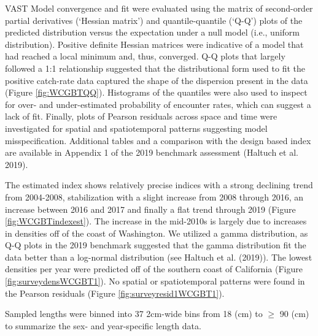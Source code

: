 \documentclass[11pt,
  english,
  a4paper,
]{article}
\begin{document}
VAST Model convergence and fit were evaluated using the matrix of second-order partial derivatives (`Hessian matrix') and quantile-quantile (`Q-Q') plots of the predicted distribution versus the expectation under a null model (i.e., uniform distribution). Positive definite Hessian matrices were indicative of a model that had reached a local minimum and, thus, converged. Q-Q plots that largely followed a 1:1 relationship suggested that the distributional form used to fit the positive catch-rate data captured the shape of the dispersion present in the data (Figure \ref{fig:WCGBTQQ}). Histograms of the quantiles were also used to inspect for over- and under-estimated probability of encounter rates, which can suggest a lack of fit. Finally, plots of Pearson residuals across space and time were investigated for spatial and spatiotemporal patterns suggesting model misspecification. Additional tables and a comparison with the design based index are available in Appendix 1 of the 2019 benchmark assessment {(Haltuch et al. 2019)\leavevmode\tagmcend\tagstructend}.

\leavevmode\tagmcend\tagstructend\par


The estimated index shows relatively precise indices with a strong declining trend from 2004-2008, stabilization with a slight increase from 2008 through 2016, an increase between 2016 and 2017 and finally a flat trend through 2019 (Figure \ref{fig:WCGBTindexest}). The increase in the mid-2010s is largely due to increases in densities off of the coast of Washington. We utilized a gamma distribution, as Q-Q plots in the 2019 benchmark suggested that the gamma distribution fit the data better than a log-normal distribution (see {Haltuch et al. (2019)\leavevmode\tagmcend\tagstructend}). The lowest densities per year were predicted off of the southern coast of California (Figure \ref{fig:surveydensWCGBT1}). No spatial or spatiotemporal patterns were found in the Pearson residuals (Figure \ref{fig:surveyresid1WCGBT1}).

\leavevmode\tagmcend\tagstructend\par

Sampled lengths were binned into 37 2cm-wide bins from 18 (cm) to {\(\geq\)\leavevmode\tagmcend\tagstructend} 90 (cm) to summarize the sex- and year-specific length data.
\end{document}
